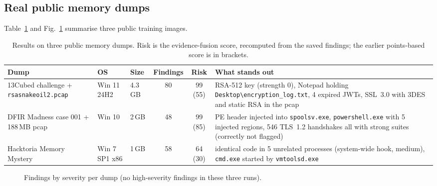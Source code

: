 \subsection{Real public memory dumps}
Table~\ref{tab:dumps} and Fig.~\ref{fig:sev} summarise three public training images.

\begin{table}[t]
\centering
\caption{Results on three public memory dumps. Risk is the evidence-fusion score, recomputed from the saved
findings; the earlier points-based score is in brackets.}
\label{tab:dumps}
\footnotesize
\begin{tabularx}{\textwidth}{@{}lllccX@{}}
\toprule
Dump & OS & Size & Findings & Risk & What stands out\\
\midrule
13Cubed challenge + \texttt{rsasnakeoil2.pcap} & Win 11 24H2 & 4.3\,GB & 80 & 99 (55) & RSA-512 key (strength 0), Notepad holding \texttt{Desktop\textbackslash encryption\_log.txt}, 4 expired JWTs, SSL~3.0 with 3DES and static RSA in the pcap\\
DFIR Madness case 001 + 188\,MB pcap & Win 10 & 2\,GB & 48 & 99 (85) & PE header injected into \texttt{spoolsv.exe}, \texttt{powershell.exe} with 5 injected regions, 546 TLS~1.2 handshakes all with strong suites (correctly not flagged)\\
Hacktoria Memory Mystery & Win 7 SP1 x86 & 1\,GB & 58 & 64 (30) & identical code in 5 unrelated processes (system-wide hook, medium), \texttt{cmd.exe} started by \texttt{vmtoolsd.exe}\\
\bottomrule
\end{tabularx}
\end{table}

\begin{figure}[t]
\centering
{}
\caption{Findings by severity per dump (no high-severity findings in these three runs).}
\label{fig:sev}
\end{figure}

